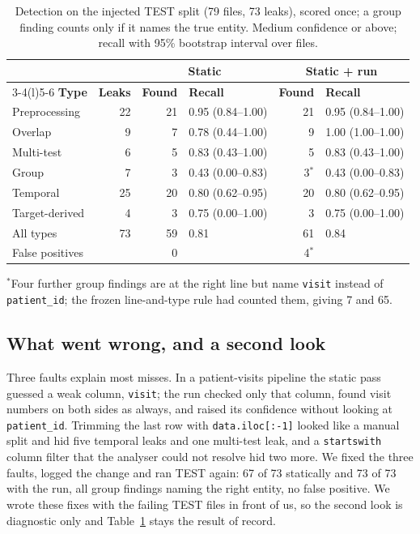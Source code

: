 \documentclass[10pt,a4paper,twocolumn]{article}
\newcommand{\code}[1]{\texttt{#1}}
\begin{document}
\begin{table}[t]
\caption{Detection on the injected TEST split (79 files, 73 leaks), scored once; a group finding counts only if it
names the true entity. Medium confidence or above; recall with 95\% bootstrap interval over files.}
\label{tab:test}
\footnotesize
\setlength{\tabcolsep}{2.6pt}
\begin{tabular}{@{}lrrlrl@{}}
\toprule
 & & \multicolumn{2}{c}{\textbf{Static}} & \multicolumn{2}{c}{\textbf{Static + run}} \\
\cmidrule(lr){3-4}\cmidrule(l){5-6}
\textbf{Type} & \textbf{Leaks} & \textbf{Found} & \textbf{Recall} & \textbf{Found} & \textbf{Recall} \\
\midrule
Preprocessing & 22 & 21 & 0.95 (0.84--1.00) & 21 & 0.95 (0.84--1.00) \\
Overlap & 9 & 7 & 0.78 (0.44--1.00) & 9 & 1.00 (1.00--1.00) \\
Multi-test & 6 & 5 & 0.83 (0.43--1.00) & 5 & 0.83 (0.43--1.00) \\
Group & 7 & 3 & 0.43 (0.00--0.83) & 3$^{*}$ & 0.43 (0.00--0.83) \\
Temporal & 25 & 20 & 0.80 (0.62--0.95) & 20 & 0.80 (0.62--0.95) \\
Target-derived & 4 & 3 & 0.75 (0.00--1.00) & 3 & 0.75 (0.00--1.00) \\
\midrule
All types & 73 & 59 & 0.81 & 61 & 0.84 \\
False positives & & 0 & & 4$^{*}$ & \\
\bottomrule
\end{tabular}

\vspace{2pt}
\raggedright $^{*}$Four further group findings are at the right line but name \code{visit} instead of
\code{patient\_id}; the frozen line-and-type rule had counted them, giving 7 and 65.
\end{table}

\subsection{What went wrong, and a second look}\label{sec:second}

Three faults explain most misses. In a patient-visits pipeline the static pass guessed a weak column,
\code{visit}; the run checked only that column, found visit numbers on both sides as always, and raised its
confidence without looking at \code{patient\_id}. Trimming the last row with \code{data.iloc[:-1]}
looked like a manual split and hid five temporal leaks and one multi-test leak, and a \code{startswith} column
filter that the analyser could not resolve hid two more. We fixed the three faults, logged the change and ran
TEST again: 67 of 73 statically and 73 of 73 with the run, all group findings naming the right entity, no false
positive. We wrote these fixes with the failing TEST files in
front of us, so the second look is diagnostic only and Table~\ref{tab:test} stays the result of record.
\end{document}
